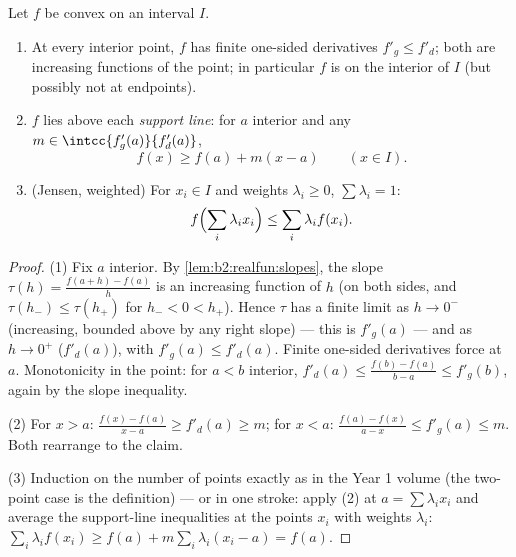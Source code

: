 \begin{theorem}\label{thm:b2:realfun:convexreg}
Let $f$ be convex on an interval $I$.
\begin{enumerate}
  \item At every interior point, $f$ has finite one-sided
        derivatives $f'_g \leq f'_d$; both are increasing functions
        of the point; in particular $f$ is  on the
        interior of $I$ (but possibly not at endpoints).
  \item $f$ lies above each \emph{support line}: for $a$ interior
        and any $m \in \intcc{f'_g(a)}{f'_d(a)}$,
        \[
        f(x) \geq f(a) + m(x - a) \qquad (x \in I).
        \]
  \item (Jensen, weighted) For $x_i \in I$ and weights $\lambda_i
        \geq 0$, $\sum\lambda_i = 1$:
        \[
        f\Bigl(\sum_i \lambda_i x_i\Bigr) \leq \sum_i \lambda_i
        f(x_i) .\index{Jensen's inequality}
        \]
\end{enumerate}
\end{theorem}

\begin{proof}
(1) Fix $a$ interior. By \cref{lem:b2:realfun:slopes}, the slope
$\tau(h) = \frac{f(a + h) - f(a)}{h}$ is an increasing function of
$h$ (on both sides, and $\tau(h_-) \leq \tau(h_+)$ for $h_- < 0 <
h_+$). Hence $\tau$ has a finite limit as $h \to 0^-$ (increasing,
bounded above by any right slope) --- this is $f'_g(a)$ --- and as
$h \to 0^+$ ($f'_d(a)$), with $f'_g(a) \leq f'_d(a)$. Finite
one-sided derivatives force  at $a$. Monotonicity in the
point: for $a < b$ interior, $f'_d(a) \leq \frac{f(b) - f(a)}{b -
a} \leq f'_g(b)$, again by the slope inequality.

(2) For $x > a$: $\frac{f(x) - f(a)}{x - a} \geq f'_d(a) \geq m$;
for $x < a$: $\frac{f(a) - f(x)}{a - x} \leq f'_g(a) \leq m$. Both
rearrange to the claim.

(3) Induction on the number of points exactly as in the Year 1
volume (the two-point case is the definition) --- or in one stroke:
apply (2) at $a = \sum\lambda_i x_i$ and average the support-line
inequalities at the points $x_i$ with weights $\lambda_i$: $\sum_i
\lambda_i f(x_i) \geq f(a) + m\sum_i\lambda_i(x_i - a) = f(a)$.
\end{proof}

